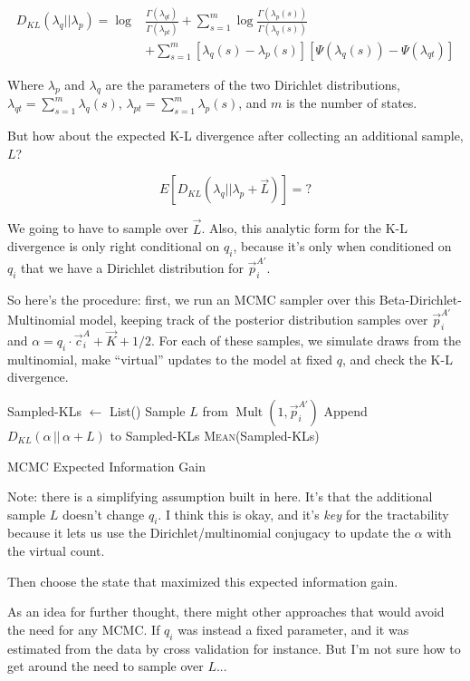 \documentclass[twocolumn,floatfix,nofootinbib,aps]{revtex4-1}
\begin{document}
\begin{align*}
D_{KL}(\lambda_q || \lambda_p) = \log& \frac{\Gamma(\lambda_{qt})}{\Gamma(\lambda_{pt})} + \sum_{s=1}^m \log \frac{\Gamma(\lambda_p(s))}{\Gamma(\lambda_q(s))} \\
&+ \sum_{s=1}^m \left[\lambda_q(s) -\lambda_p(s)\right]\left[\Psi(\lambda_q(s)) - \Psi(\lambda_{qt})\right]
\end{align*}

Where $\lambda_p$ and $\lambda_q$ are the parameters of the two Dirichlet distributions, $\lambda_{qt} = \sum_{s=1}^{m}\lambda_q(s)$, $\lambda_{pt} = \sum_{s=1}^{m}\lambda_p(s)$, and $m$ is the number of states.

But how about the expected K-L divergence after collecting an additional sample, $L$?

$$
E[D_{KL}(\lambda_q || \lambda_p + \vec{L})] = ?
$$

We going to have to sample over $\vec{L}$. Also, this analytic form for the K-L divergence is only right conditional on $q_i$, because it's only when conditioned on $q_i$ that we have a Dirichlet distribution for $\vec{p}_i^{A'}$.

So here's the procedure: first, we run an MCMC sampler over this Beta-Dirichlet-Multinomial model, keeping track of the posterior distribution samples over $\vec{p}_i^{A'}$ and $\alpha = q_i \cdot \vec{c}_i^A + \vec{K} + 1/2$. For each of these samples, we simulate draws from the multinomial, make ``virtual'' updates to the model at fixed $q$, and check the K-L divergence.\\



\begin{algorithm}[H]
\centering
\begin{algorithmic}[c]
\State Sampled-KLs $\gets$ List()
       \State Sample $L$ from $\operatorname{Mult}(1, \vec{p}_i^{A'})$
       \State Append $D_{KL}(\alpha \,||\, \alpha + L)$ to Sampled-KLs
    \EndFor
\EndFor
\State \Return \textsc{Mean}(Sampled-KLs)
\end{algorithmic}
\caption{MCMC Expected Information Gain}
\end{algorithm}

Note: there is a simplifying assumption built in here. It's that the additional sample $L$ doesn't change $q_i$. I think this is okay, and it's \emph{key} for the tractability because it lets us use the Dirichlet/multinomial conjugacy to update the $\alpha$ with the virtual count.

Then choose the state that maximized this expected information gain.

As an idea for further thought, there might other approaches that would avoid the need for any MCMC. If $q_i$ was instead a fixed parameter, and it was estimated from the data by cross validation for instance. But I'm not sure how to get around the need to sample over $L$...
\end{document}
